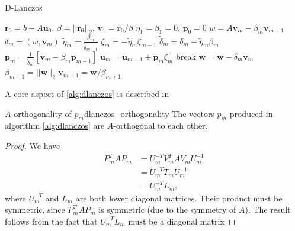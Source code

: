 \begin{algorithm}[H]
  \caption{D-Lanczos \cite[Algorithm 6.17]{iter_method_saad}}
  \begin{algorithmic}
    \State $\mathbf{r}_0 = b - A\mathbf{u}_0$, $\beta = ||\mathbf{r}_0||_2$, $\mathbf{v}_1 = \mathbf{r}_0 / \beta$
    \State $\tilde{\eta}_1 = \beta_1 = 0$, $\mathbf{p}_0 = 0$
    \State $w = A\mathbf{v}_m - \beta_m \mathbf{v}_{m-1}$
    \State $\delta_m = (w, \mathbf{v}_m)$
    \State $\tilde{\eta}_m = \frac{\beta_m}{\tilde{\delta}_{m-1}}$
    \State $\zeta_m = -\tilde{\eta}_m \zeta_{m-1}$
    \EndIf
    \State $\tilde{\delta}_m = \delta_m - \tilde{\eta}_m \beta_m$
    \State $\mathbf{p}_m = \frac{1}{\tilde{\delta}_m}\left[\mathbf{v}_m - \beta_m \mathbf{p}_{m-1}\right]$
    \State $\mathbf{u}_m = \mathbf{u}_{m-1} + \mathbf{p}_m \zeta_m$
    \State break
    \EndIf
    \State $\mathbf{w} = \mathbf{w} - \delta_m \mathbf{v}_m$
    \State $\beta_{m+1} = ||\mathbf{w}||_2$
    \State $\mathbf{v}_{m+1} = \mathbf{w} / \beta_{m+1}$
    \EndFor
  \end{algorithmic}
  \label{alg:dlanczos}
\end{algorithm}
A core aspect of \cref{alg:dlanczos} is described in 
\begin{APPfancyth}{$A$-orthogonality of $p_m$}{dlanczos_orthogonality}
  The vectors $p_m$ produced in algorithm \cref{alg:dlanczos} are $A$-orthogonal to each other.
\end{APPfancyth}
\begin{proof}
  We have
  \begin{align*}
    P^T_m A P_m & = U_m^{-T} V_m^T A V_m U_m^{-1} \\
                & = U_m^{-T} T_m U_m^{-1}         \\
                & = U_m^{-T} L_m,
  \end{align*}
  where $U_m^{-T}$ and $L_m$ are both lower diagonal matrices. Their product must be symmetric, since $P^T_m A P_m$ is symmetric (due to the symmetry of $A$). The result follows from the fact that $U_m^{-T} L_m$ must be a diagonal matrix
\end{proof}

